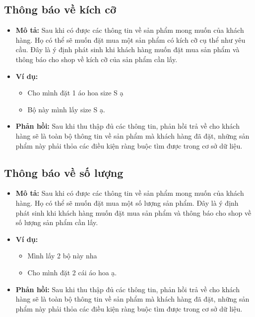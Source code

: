 \subsection{Thông báo về kích cỡ}
\begin{itemize}
    \item \textbf{Mô tả:} Sau khi có được các thông tin về sản phẩm
    mong muốn của khách hàng. Họ có thể sẽ muốn đặt mua một sản phẩm
    có kích cỡ cụ thể như yêu cầu. Đây là ý định phát sinh khi
    khách hàng muốn đặt mua sản phẩm và thông báo cho shop về
    kích cỡ của sản phẩm cần lấy.
    \item \textbf{Ví dụ:}
    \begin{itemize}
        \item Cho mình đặt 1 áo hoa size S ạ
        \item Bộ này mình lấy size S ạ.
    \end{itemize}
    \item \textbf{Phản hồi:} Sau khi thu thập đủ các thông tin,
    phản hồi trả về cho khách hàng sẽ là toàn bộ thông tin về
    sản phẩm mà khách hàng đã đặt, những sản phẩm này phải thỏa
    các điều kiện ràng buộc tìm được trong cơ sở dữ liệu.
\end{itemize}

\subsection{Thông báo về số lượng}
\begin{itemize}
    \item \textbf{Mô tả:} Sau khi có được các thông tin về sản phẩm
    mong muốn của khách hàng. Họ có thể sẽ muốn đặt mua một số lượng
    sản phẩm. Đây là ý định phát sinh khi khách hàng muốn đặt mua
    sản phẩm và thông báo cho shop về số lượng sản phẩm cần lấy.
    \item \textbf{Ví dụ:}
    \begin{itemize}
        \item Mình lấy 2 bộ này nha
        \item Cho mình đặt 2 cái áo hoa ạ.
    \end{itemize}
    \item \textbf{Phản hồi:} Sau khi thu thập đủ các thông tin,
    phản hồi trả về cho khách hàng sẽ là toàn bộ thông tin về
    sản phẩm mà khách hàng đã đặt, những sản phẩm này phải thỏa
    các điều kiện ràng buộc tìm được trong cơ sở dữ liệu.
\end{itemize}


